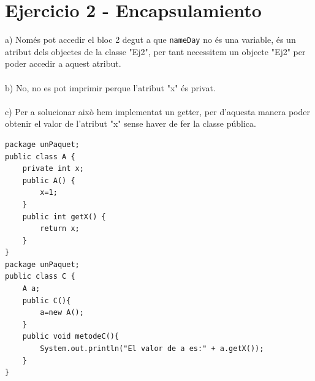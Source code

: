 \documentclass[a4paper, 12pt]{article}
\begin{document}
\section*{Ejercicio 2 - Encapsulamiento}
a) Només pot accedir el bloc 2 degut a que \texttt{nameDay} no és una variable, és un atribut dels objectes de la classe "Ej2", per tant necessitem un objecte "Ej2" per poder accedir a aquest atribut.\\\\
b) No, no es pot imprimir perque l'atribut "x" és privat.\\\\
c) Per a solucionar això hem implementat un getter, per d'aquesta manera poder obtenir el valor de l'atribut "x" sense haver de fer la classe pública.
\begin{lstlisting}
package unPaquet;
public class A {
    private int x;
    public A() {
        x=1;
    }
    public int getX() {
        return x;
    }
}
package unPaquet;
public class C {
    A a;
    public C(){
        a=new A();
    }
    public void metodeC(){
        System.out.println("El valor de a es:" + a.getX());
    }
}
\end{lstlisting}
\end{document}
